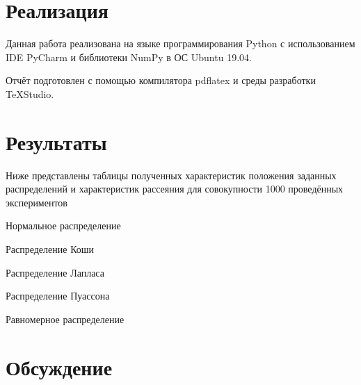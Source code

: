 \section{Реализация}
Данная работа реализована на языке программирования Python с использованием IDE PyCharm и библиотеки NumPy в ОС Ubuntu 19.04.

Отчёт подготовлен с помощью компилятора pdflatex и среды разработки TeXStudio.

\section{Результаты}
Ниже представлены таблицы полученных характеристик положения заданных распределений и характеристик рассеяния для совокупности 1000 проведённых экспериментов

\begin{table}[H]
	\begin{center}
		
		\caption{Нормальное распределение}
		\label{tabl:tabl_name}
	\end{center}
\end{table}

\begin{table}[H]
	\begin{center}
		
		\caption{Распределение Коши}
		\label{tabl:tabl_name}
	\end{center}
\end{table}

\begin{table}[H]
	\begin{center}
		
		\caption{Распределение Лапласа}
		\label{tabl:tabl_name}
	\end{center}
\end{table}

\begin{table}[H]
	\begin{center}
		
		\caption{Распределение Пуассона}
		\label{tabl:tabl_name}
	\end{center}
\end{table}

\begin{table}[H]
	\begin{center}
		
		\caption{Равномерное распределение}
		\label{tabl:tabl_name}
	\end{center}
\end{table}


\section{Обсуждение}


